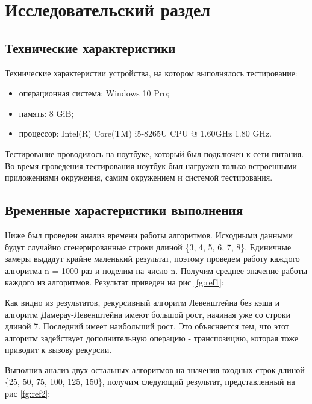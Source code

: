 \chapter{Исследовательский раздел}
\section{Технические характеристики}
Технические характеристии устройства, на котором выполнялось тестирование:
\begin{itemize}
	\item операционная система: Windows 10 Pro;
	\item память: 8 GiB;
	\item процессор: Intel(R) Core(TM) i5-8265U CPU @ 1.60GHz   1.80 GHz.
\end{itemize}
Тестирование проводилось на ноутбуке, который был подключен к сети питания. Во время проведения тестирования ноутбук был нагружен только встроенными приложениями окружения, самим окружением и системой тестирования.

\section{Временные харастеристики выполнения}
Ниже был проведен анализ времени работы алгоритмов. Исходными данными будут случайно сгенерированные строки длиной \{3, 4, 5, 6, 7, 8\}. Единичные замеры выдадут крайне маленький результат, поэтому  проведем работу каждого алгоритма n = 1000 раз и поделим на число n. Получим среднее значение работы каждого из алгоритмов. Результат приведен на рис \ref{fg:ref1}:

\begin{figure}[H]
\end{figure} 

Как видно из результатов, рекурсивный алгоритм Левенштейна без кэша и алгоритм Дамерау-Левенштейна имеют большой рост, начиная уже со строки длиной 7. Последний имеет наибольший рост. Это объясняется тем, что этот алгоритм задействует дополнительную операцию - транспозицию, которая тоже приводит к вызову рекурсии.

Выполнив анализ двух остальных алгоритмов на значения входных строк длиной \{25, 50, 75, 100, 125, 150\}, получим следующий результат, представленный на рис  \ref{fg:ref2}:
\begin{figure}[H]
\end{figure} 

